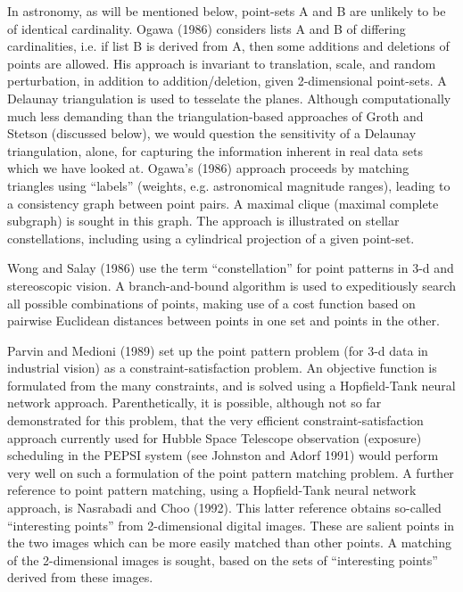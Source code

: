 In astronomy, as will be mentioned below, point-sets A and B are unlikely
to be of identical cardinality.
Ogawa (1986) considers lists A and B of differing cardinalities, i.e. if list
B is derived from A, then some additions and deletions of points are
allowed.  His approach is invariant to translation, scale, and random
perturbation, in addition to addition/deletion, given 2-dimensional 
point-sets. A Delaunay triangulation is used to tesselate the planes.  Although
computationally much less demanding than the triangulation-based approaches
of Groth and Stetson (discussed below), we would question the sensitivity 
of a Delaunay triangulation, alone, for capturing the information inherent
in real data sets which we have looked at.  Ogawa's (1986) approach proceeds
by matching triangles using ``labels'' (weights, e.g. 
astronomical magnitude ranges), 
leading to a consistency graph between point pairs.
A maximal clique (maximal complete subgraph) is sought in this graph.
The approach is illustrated on stellar constellations, including using a 
cylindrical projection of a given point-set.

Wong and Salay (1986) use the term ``constellation'' for point patterns in
3-d and stereoscopic vision.  A branch-and-bound algorithm is used to 
expeditiously search all possible combinations of points, making use of a
cost function based on pairwise Euclidean distances between 
points in one set and points in the other.

Parvin and Medioni (1989) set up the point pattern problem (for 3-d data
in industrial vision) as a constraint-satisfaction problem.  An objective 
function is
formulated from the many constraints, and is solved using
a Hopfield-Tank neural network approach.  Parenthetically, it is possible, 
although not so far demonstrated for this problem, that 
the very efficient constraint-satisfaction
approach currently used for Hubble Space Telescope observation 
(exposure) scheduling in the PEPSI system (see Johnston and Adorf 1991) 
would perform very well on such a formulation of the point pattern
matching problem.   A further reference to point pattern matching, using
a Hopfield-Tank neural network approach, is Nasrabadi and Choo (1992).
This latter reference obtains so-called ``interesting points'' from 
2-dimensional digital images.  These are salient points in the two images
which can be more easily matched than other points.  A matching of the 
2-dimensional images is sought, based on the sets of ``interesting points''
derived from these images.

